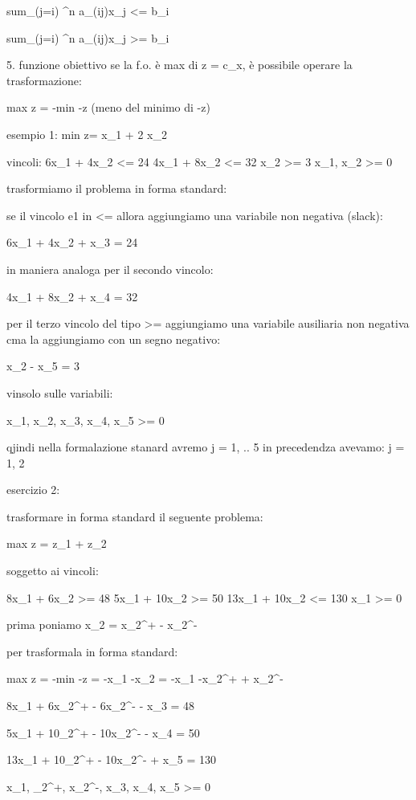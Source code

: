 	sum_(j=i) ^n a_(ij)x_j <= b_i
	
	sum_(j=i) ^n a_(ij)x_j >= b_i


5. funzione obiettivo
	se la f.o. è max di z = c_x, è possibile operare la trasformazione:
	
	max z = -min {-z} (meno del minimo di -z)


esempio 1:
min z= x_1 + 2 x_2

vincoli:
6x_1 + 4x_2 <= 24
4x_1 + 8x_2 <= 32
x_2 >= 3
x_1, x_2 >= 0

trasformiamo il problema in forma standard:

se il vincolo e1 in <= allora aggiungiamo una variabile non negativa (slack):

6x_1 + 4x_2 + x_3 = 24

in maniera analoga per il secondo vincolo:

4x_1 + 8x_2 + x_4 = 32

per il terzo vincolo del tipo >= aggiungiamo una variabile ausiliaria non negativa cma la aggiungiamo con un segno negativo:

x_2 - x_5 = 3


vinsolo sulle variabili:

x_1, x_2, x_3, x_4, x_5 >= 0


qjindi nella formalazione stanard avremo j = 1, .. 5 in precedendza avevamo: j = 1, 2



esercizio 2:

trasformare in forma standard il seguente problema:

max z = z_1 + z_2

soggetto ai vincoli:

8x_1 + 6x_2 >= 48
5x_1 + 10x_2 >= 50
13x_1 + 10x_2 <= 130
x_1 >= 0


prima poniamo x_2 = x_2^+ - x_2^-



per trasformala in forma standard:





max z = -min -z = -x_1 -x_2 = -x_1 -x_2^+ + x_2^-


8x_1 + 6x_2^+ - 6x_2^- - x_3 = 48

5x_1 + 10_2^+ - 10x_2^- - x_4 = 50

13x_1 + 10_2^+ - 10x_2^- + x_5 = 130


x_1, _2^+, x_2^-, x_3, x_4, x_5 >= 0




























